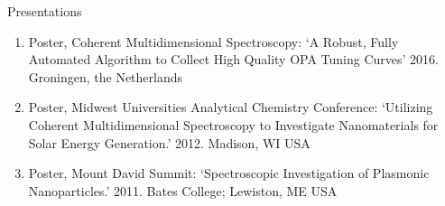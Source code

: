 \documentclass{resume}  %
\begin{document}
\begin{rSection}{Presentations}  %

\begin{enumerate}[leftmargin = 0 pt]
\item Poster, Coherent Multidimensional Spectroscopy: `A Robust, Fully Automated Algorithm to Collect High Quality OPA Tuning Curves' 2016. Groningen, the Netherlands
\item Poster, Midwest Universities Analytical Chemistry Conference:
`Utilizing Coherent Multidimensional Spectroscopy to Investigate Nanomaterials for Solar Energy Generation.'
2012. Madison, WI USA
\item Poster, Mount David Summit:
`Spectroscopic Investigation of Plasmonic Nanoparticles.'
2011. Bates College; Lewiston, ME USA
\end{enumerate}

\end{rSection}
\end{document}
